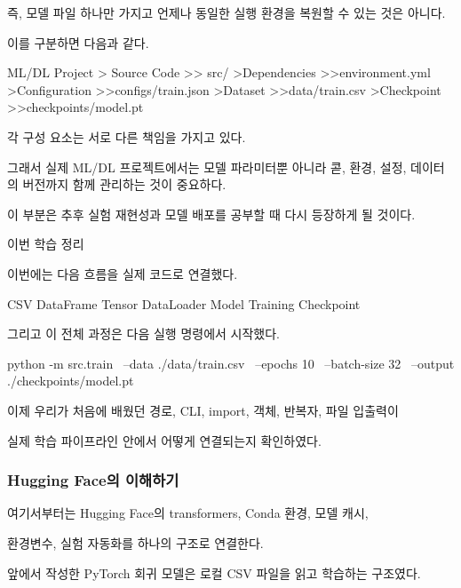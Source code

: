 즉, 모델 파일 하나만 가지고 언제나 동일한 실행 환경을 복원할 수 있는 것은 아니다.

이를 구분하면 다음과 같다.

\begin{dhkdir}[in=6]
ML/DL Project
> Source Code
>> src/
>Dependencies
>>environment.yml
>Configuration
>>configs/train.json
>Dataset
>>data/train.csv
>Checkpoint
>>checkpoints/model.pt
\end{dhkdir}

각 구성 요소는 서로 다른 책임을 가지고 있다.

그래서 실제 ML/DL 프로젝트에서는 모델 파라미터뿐 아니라 콛, 환경, 설정, 데이터의 버전까지 함께 관리하는 것이 중요하다.

이 부분은 추후 실험 재현성과 모델 배포를 공부할 때 다시 등장하게 될 것이다.

\begin{dhknote}
\begin{dhksmry}[centered]
이번 학습 정리
\end{dhksmry}
\end{dhknote}

이번에는 다음 흐름을 실제 코드로 연결했다.

\begin{dhksmry}[centered]
CSV 
\da 
DataFrame 
\da 
Tensor
\da
DataLoader
\da
Model
\da
Training
\da
Checkpoint 
\end{dhksmry}

그리고 이 전체 과정은 다음 실행 명령에서 시작했다.

\begin{dhkzsh}
python -m src.train \
    --data ./data/train.csv \
    --epochs 10 \
    --batch-size 32 \
    --output ./checkpoints/model.pt
\end{dhkzsh}

이제 우리가 처음에 배웠던 경로, CLI, import, 객체, 반복자, 파일 입출력이

실제 학습 파이프라인 안에서 어떻게 연결되는지 확인하였다.

\subsubsection{Hugging Face의  이해하기}

여기서부터는 Hugging Face의 transformers, Conda 환경, 모델 캐시,

환경변수, 실험 자동화를 하나의 구조로 연결한다.

앞에서 작성한 PyTorch 회귀 모델은 로컬 CSV 파일을 읽고 학습하는 구조였다.

